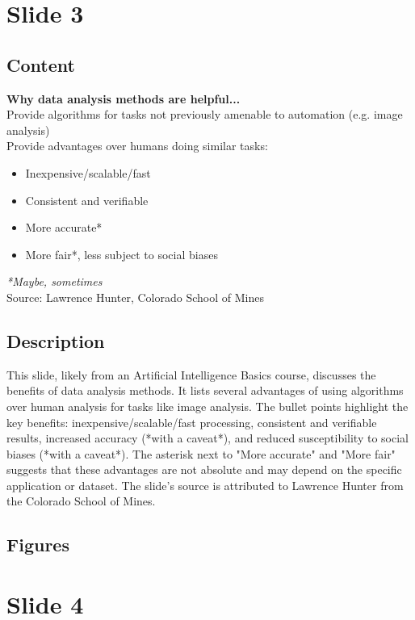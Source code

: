\documentclass{article}%
\begin{document}
%
\newpage%
\section{Slide 3}%
\label{sec:Slide3}%
\subsection{Content}%

\textbf{Why data analysis methods are helpful...} \\
Provide algorithms for tasks not previously amenable to automation (e.g. image analysis) \\
Provide advantages over humans doing similar tasks: \\
\begin{itemize}
    \item Inexpensive/scalable/fast
    \item Consistent and verifiable
    \item More accurate*
    \item More fair*, less subject to social biases
\end{itemize}
\textit{*Maybe, sometimes} \\
Source: Lawrence Hunter, Colorado School of Mines
%
\subsection{Description}%
This slide, likely from an Artificial Intelligence Basics course, discusses the benefits of data analysis methods.  It lists several advantages of using algorithms over human analysis for tasks like image analysis.  The bullet points highlight the key benefits:  inexpensive/scalable/fast processing, consistent and verifiable results, increased accuracy (*with a caveat*), and reduced susceptibility to social biases (*with a caveat*).  The asterisk next to "More accurate" and "More fair" suggests that these advantages are not absolute and may depend on the specific application or dataset. The slide's source is attributed to Lawrence Hunter from the Colorado School of Mines.%
\subsection{Figures}%
\begin{figure}[H]%
\centering%
\end{figure}

%
\newpage%
\section{Slide 4}%
\label{sec:Slide4}%
\end{document}
